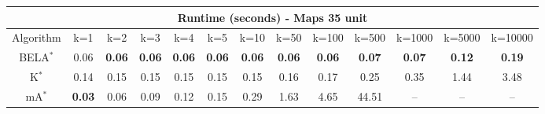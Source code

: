 \begin{tabular}{c|cccccccccccc}\toprule
\multicolumn{13}{c}{Runtime (seconds) - Maps 35 unit}\\ \midrule
Algorithm & k=1 & k=2 & k=3 & k=4 & k=5 & k=10 & k=50 & k=100 & k=500 & k=1000 & k=5000 & k=10000 \\ \midrule
BELA$^*$ & 0.06 & \textbf{0.06} & \textbf{0.06} & \textbf{0.06} & \textbf{0.06} & \textbf{0.06} & \textbf{0.06} & \textbf{0.06} & \textbf{0.07} & \textbf{0.07} & \textbf{0.12} & \textbf{0.19} \\
K$^*$ & 0.14 & 0.15 & 0.15 & 0.15 & 0.15 & 0.15 & 0.16 & 0.17 & 0.25 & 0.35 & 1.44 & 3.48 \\
mA$^*$ & \textbf{0.03} & 0.06 & 0.09 & 0.12 & 0.15 & 0.29 & 1.63 & 4.65 & 44.51 & -- & -- & -- \\ \bottomrule 
\end{tabular}

